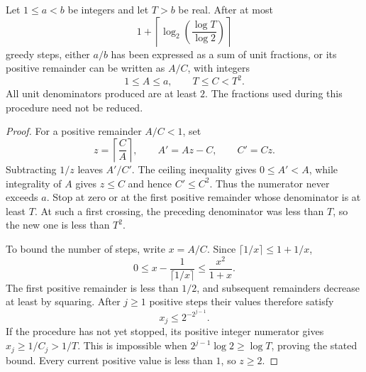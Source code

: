 \begin{lemma}\label{lem:greedy}
Let \(1\le a<b\) be integers and let \(T>b\) be real.
After at most
\[
 1+\left\lceil\log_2\left(\frac{\log T}{\log 2}\right)\right\rceil
\]
greedy steps, either \(a/b\) has been expressed as a sum of unit fractions,
or its positive remainder can be written as \(A/C\), with integers
\[
 1\le A\le a,\qquad T\le C<T^2.
\]
All unit denominators produced are at least \(2\).
The fractions used during this procedure need not be reduced.
\end{lemma}

\begin{proof}
For a positive remainder \(A/C<1\), set
\[
 z=\left\lceil\frac CA\right\rceil,\qquad
 A'=Az-C,\qquad C'=Cz.
\]
Subtracting \(1/z\) leaves \(A'/C'\).
The ceiling inequality gives \(0\le A'<A\), while integrality of \(A\)
gives \(z\le C\) and hence \(C'\le C^2\).
Thus the numerator never exceeds \(a\).
Stop at zero or at the first positive remainder whose denominator is at
least \(T\).  At such a first crossing, the preceding denominator was
less than \(T\), so the new one is less than \(T^2\).

To bound the number of steps, write \(x=A/C\).  Since
\(\lceil1/x\rceil\le 1+1/x\),
\[
 0\le x-\frac1{\lceil1/x\rceil}
 \le \frac{x^2}{1+x}.
\]
The first positive remainder is less than \(1/2\), and subsequent
remainders decrease at least by squaring.  After \(j\ge1\) positive
steps their values therefore satisfy
\[
 x_j\le 2^{-2^{j-1}}.
\]
If the procedure has not yet stopped, its positive integer numerator
gives \(x_j\ge 1/C_j>1/T\).  This is impossible when
\(2^{j-1}\log2\ge\log T\), proving the stated bound.
Every current positive value is less than \(1\), so \(z\ge2\).
\end{proof}

